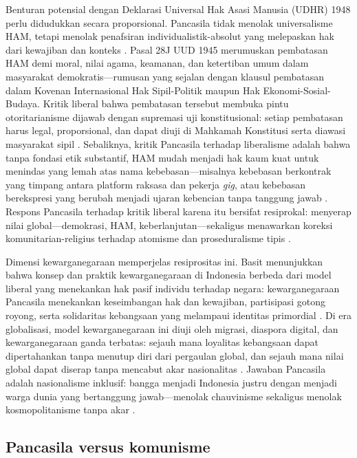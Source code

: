 \documentclass[journal]{IEEEtran}
\begin{document}
Benturan potensial dengan Deklarasi Universal Hak Asasi Manusia (UDHR) 1948 perlu didudukkan secara proporsional. Pancasila tidak menolak universalisme HAM, tetapi menolak penafsiran individualistik-absolut yang melepaskan hak dari kewajiban dan konteks \cite{ulumhamida2018,assiddiqie2006}. Pasal 28J UUD 1945 merumuskan pembatasan HAM demi moral, nilai agama, keamanan, dan ketertiban umum dalam masyarakat demokratis---rumusan yang sejalan dengan klausul pembatasan dalam Kovenan Internasional Hak Sipil-Politik maupun Hak Ekonomi-Sosial-Budaya. Kritik liberal bahwa pembatasan tersebut membuka pintu otoritarianisme dijawab dengan supremasi uji konstitusional: setiap pembatasan harus legal, proporsional, dan dapat diuji di Mahkamah Konstitusi serta diawasi masyarakat sipil \cite{assiddiqie2006,aswandi2019}. Sebaliknya, kritik Pancasila terhadap liberalisme adalah bahwa tanpa fondasi etik substantif, HAM mudah menjadi hak kaum kuat untuk menindas yang lemah atas nama kebebasan---misalnya kebebasan berkontrak yang timpang antara platform raksasa dan pekerja \textit{gig}, atau kebebasan berekspresi yang berubah menjadi ujaran kebencian tanpa tanggung jawab \cite{madung2016,rahmatullah2022}. Respons Pancasila terhadap kritik liberal karena itu bersifat resiprokal: menyerap nilai global---demokrasi, HAM, keberlanjutan---sekaligus menawarkan koreksi komunitarian-religius terhadap atomisme dan proseduralisme tipis \cite{ulumhamida2018,madungmere2021}.

Dimensi kewarganegaraan memperjelas resiprositas ini. Basit menunjukkan bahwa konsep dan praktik kewarganegaraan di Indonesia berbeda dari model liberal yang menekankan hak pasif individu terhadap negara: kewarganegaraan Pancasila menekankan keseimbangan hak dan kewajiban, partisipasi gotong royong, serta solidaritas kebangsaan yang melampaui identitas primordial \cite{basit2023}. Di era globalisasi, model kewarganegaraan ini diuji oleh migrasi, diaspora digital, dan kewarganegaraan ganda terbatas: sejauh mana loyalitas kebangsaan dapat dipertahankan tanpa menutup diri dari pergaulan global, dan sejauh mana nilai global dapat diserap tanpa mencabut akar nasionalitas \cite{kurniasih2016,basit2023,ulumhamida2018}. Jawaban Pancasila adalah nasionalisme inklusif: bangga menjadi Indonesia justru dengan menjadi warga dunia yang bertanggung jawab---menolak chauvinisme sekaligus menolak kosmopolitanisme tanpa akar \cite{latif2018,madungmere2021}.

\subsection{Pancasila versus komunisme}
\end{document}
